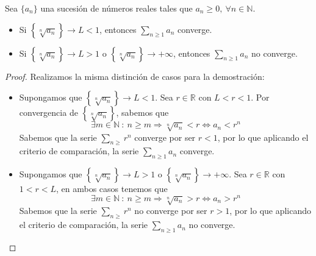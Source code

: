 \begin{prop}
    Sea $\{a_n\}$ una sucesión de números reales tales que $a_n \geq 0, ~ \forall n \in \mathbb{N}$.
    \begin{itemize}
        \item Si $\left\{\sqrt[n]{a_n}\right\} \longrightarrow L < 1$, entonces $\displaystyle\sum_{n \geq 1} a_n$ converge.

        \item Si $\left\{\sqrt[n]{a_n}\right\} \longrightarrow L > 1$ o $\left\{\sqrt[n]{a_n}\right\} \longrightarrow + \infty$, entonces $\displaystyle\sum_{n \geq 1} a_n$ no converge.
    \end{itemize}
\end{prop}
\begin{proof} Realizamos la misma distinción de casos para la demostración:
\begin{itemize}
    \item Supongamos que $\left\{\sqrt[n]{a_n}\right\} \longrightarrow L < 1$. Sea $r \in \mathbb{R}$ con $L < r < 1$.
    Por convergencia de  $\left\{\sqrt[n]{a_n}\right\}$, sabemos que
    \begin{equation*}
        \exists m \in \mathbb{N} ~:~ n \geq m \Longrightarrow \sqrt[n]{a_n} < r \Longleftrightarrow a_n < r^n
    \end{equation*}
    Sabemos que la serie $\displaystyle\sum_{n \geq} r^n$ converge por ser $ r < 1$, por lo que aplicando el criterio de comparación,
    la serie $\displaystyle\sum_{n \geq 1} a_n$ converge.

    \item Supongamos que $\left\{\sqrt[n]{a_n}\right\} \longrightarrow L > 1$ o $\left\{\sqrt[n]{a_n}\right\} \longrightarrow + \infty$.
    Sea $r \in \mathbb{R}$ con  $1 < r < L$, en ambos casos tenemos que
    \begin{equation*}
        \exists m \in \mathbb{N} ~:~ n \geq m \Longrightarrow \sqrt[n]{a_n} > r \Longleftrightarrow a_n > r^n
    \end{equation*}
    Sabemos que la serie $\displaystyle\sum_{n \geq} r^n$ no converge por ser $ r > 1$, por lo que aplicando el criterio de comparación,
    la serie $\displaystyle\sum_{n \geq 1} a_n$ no converge. \qedhere
\end{itemize}
    
\end{proof}

